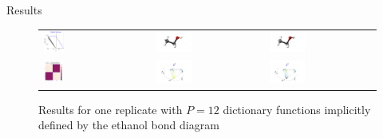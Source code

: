 \begin{frame}{Results}
\begin{figure}[!htp]
    \centering
    \begin{tabular}{p{3cm}p{3cm}p{3cm}}
        \includegraphics[width=0.2\textwidth]{img/reg_small.png} &
        \includegraphics[width=0.35\textwidth, trim={3cm 0cm 0cm 4cm}, clip]{img/ethanol_g0.png} &
          \includegraphics[width=0.35\textwidth, trim={3cm 0cm 0cm 4cm}, clip]{img/ethanol_g2.png}  \\
        \includegraphics[width=0.2\textwidth, trim={0cm 0cm 3cm 0cm}, clip]{img/cosines_sellasso_small.png} &
        \includegraphics[width=0.35\textwidth, trim={3cm 0cm 0cm 3cm}, clip]{img/ethanol_small_embedding_0.png} &
          \includegraphics[width=0.35\textwidth, trim={3cm 0cm 0cm 3cm}, clip]{img/ethanol_small_embedding_1.png} 
    \end{tabular}
    \caption*{Results for one replicate with $P=12$ dictionary functions implicitly defined by the ethanol bond diagram}
\end{figure}
\end{frame}
